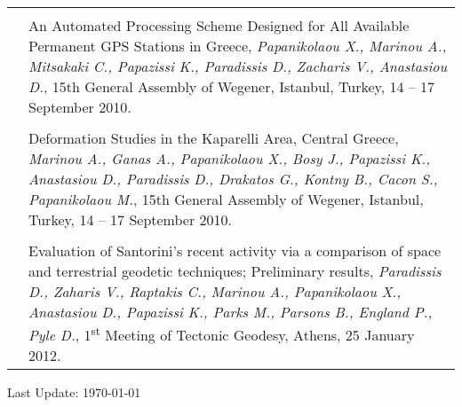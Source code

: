 \documentclass[a4paper,10pt]{article} %
\begin{document}
\begin{longtable}{r|p{14cm}}
  &\\

  & An Automated Processing Scheme Designed for All Available Permanent GPS Stations in Greece,
  \emph{Papanikolaou X., Marinou A., Mitsakaki C., Papazissi K., Paradissis D., Zacharis V., Anastasiou D.},
  15th General Assembly of Wegener, Istanbul, Turkey, 14 – 17 September 2010.\\

  &\\

  & Deformation Studies in the Kaparelli Area, Central Greece,
  \emph{Marinou A., Ganas A., Papanikolaou X., Bosy J., Papazissi K., Anastasiou D., Paradissis D., Drakatos G., Kontny B., Cacon S., Papanikolaou M.},
  15th General Assembly of Wegener, Istanbul, Turkey, 14 – 17 September 2010.\\

  &\\

  & Evaluation of Santorini's recent activity via a comparison of space and terrestrial geodetic techniques; Preliminary results,
  \emph{Paradissis D., Zaharis V., Raptakis C., Marinou A., Papanikolaou X., Anastasiou D., Papazissi K., Parks M., Parsons B., England P., Pyle D.},
  1\textsuperscript{st} Meeting of Tectonic Geodesy, Athens, 25 January 2012.\\

\end{longtable}



\vfill
\begin{center}
  \begin{footnotesize}
    Last Update: \today
  \end{footnotesize}
\end{center}
\end{document}
